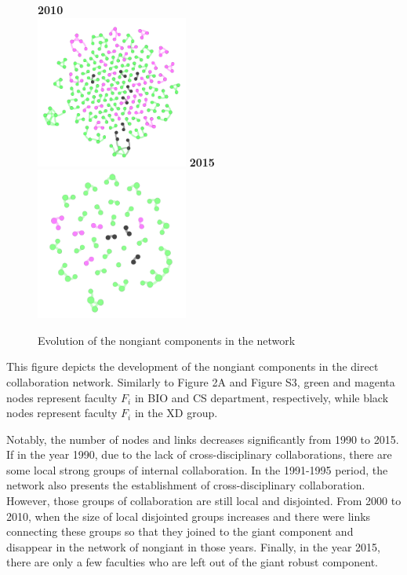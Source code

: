 \documentclass[10pt]{article}         %
\begin{document}
\begin{figure}[!htb]
  \endminipage\hfill
    \textbf{2010}\\
    \includegraphics[width=5cm, height=5cm]{S42010.png}
  \endminipage\hfill
    \textbf{2015}\\
    \includegraphics[width=5cm, height=5cm]{S42015.png}
  \endminipage
  \caption{Evolution of the nongiant components in the network}
  \label{fig:s4}
\end{figure}

This figure depicts the development of the nongiant components in the direct collaboration network. Similarly to Figure 2A and Figure S3, green and magenta nodes represent faculty $F_i$ in BIO and CS department, respectively, while black nodes represent faculty $F_i$ in the XD group. 

Notably, the number of nodes and links decreases significantly from 1990 to 2015. If in the year 1990, due to the lack of cross-disciplinary collaborations, there are some local strong groups of internal collaboration. In the 1991-1995 period, the network also presents the establishment of cross-disciplinary collaboration. However, those groups of collaboration are still local and disjointed. From 2000 to 2010, when the size of local disjointed groups increases and there were links connecting these groups so that they joined to the giant component and disappear in the network of nongiant in those years. Finally, in the year 2015, there are only a few faculties who are left out of the giant robust component.




\bigskip   %
\end{document}
